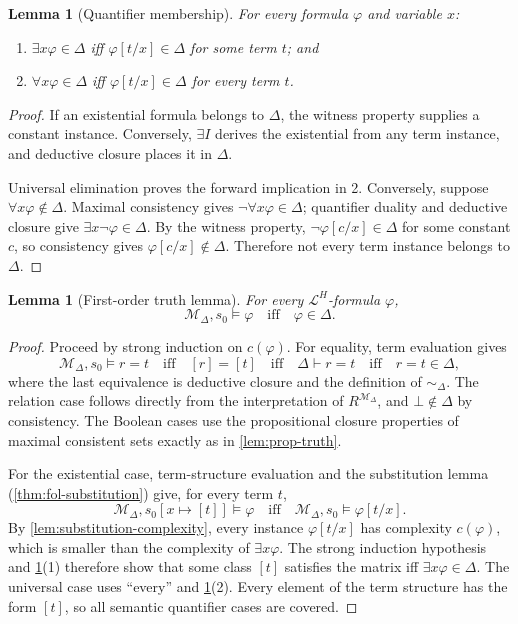 \documentclass[11pt,oneside,openany]{book}
\theoremstyle{definition}
\theoremstyle{plain}
\newtheorem{lemma}[definition]{Lemma}
\theoremstyle{remark}
\newcommand{\Lang}{\mathcal{L}}
\newcommand{\Meta}{\mathcal{M}}
\newcommand{\entails}{\models}
\newcommand{\derives}{\vdash}
\newcommand{\bottom}{\bot}
\begin{document}
\begin{lemma}[Quantifier membership]
\label{lem:quantifier-membership}
For every formula \(\varphi\) and variable \(x\):
\begin{enumerate}
  \item \(\exists x\varphi\in\Delta\) iff
        \(\varphi[t/x]\in\Delta\) for some term \(t\); and
  \item \(\forall x\varphi\in\Delta\) iff
        \(\varphi[t/x]\in\Delta\) for every term \(t\).
\end{enumerate}
\end{lemma}
\begin{proof}
If an existential formula belongs to \(\Delta\), the witness property supplies
a constant instance.  Conversely, \(\exists I\) derives the existential from
any term instance, and deductive closure places it in \(\Delta\).

Universal elimination proves the forward implication in 2.  Conversely,
suppose \(\forall x\varphi\notin\Delta\).  Maximal consistency gives
\(\neg\forall x\varphi\in\Delta\); quantifier duality and deductive closure
give \(\exists x\neg\varphi\in\Delta\).  By the witness property,
\(\neg\varphi[c/x]\in\Delta\) for some constant \(c\), so consistency gives
\(\varphi[c/x]\notin\Delta\).  Therefore not every term instance belongs to
\(\Delta\).
\end{proof}

\begin{lemma}[First-order truth lemma]
\label{lem:fol-truth}
For every \(\Lang^H\)-formula \(\varphi\),
\[
 \Meta_\Delta,s_0\entails\varphi
 \quad\text{iff}\quad
 \varphi\in\Delta.
\]
\end{lemma}
\begin{proof}
Proceed by strong induction on \(c(\varphi)\).  For equality, term evaluation gives
\[
 \Meta_\Delta,s_0\entails r=t
 \quad\text{iff}\quad [r]=[t]
 \quad\text{iff}\quad \Delta\derives r=t
 \quad\text{iff}\quad r=t\in\Delta,
\]
where the last equivalence is deductive closure and the definition of
\(\sim_\Delta\).  The relation case follows directly from the interpretation
of \(R^{\Meta_\Delta}\), and \(\bottom\notin\Delta\) by consistency.  The
Boolean cases use the propositional closure properties of maximal consistent
sets exactly as in \cref{lem:prop-truth}.

For the existential case, term-structure evaluation and the substitution
lemma (\cref{thm:fol-substitution}) give, for every term \(t\),
\[
 \Meta_\Delta,s_0[x\mapsto[t]]\entails\varphi
 \quad\text{iff}\quad
 \Meta_\Delta,s_0\entails\varphi[t/x].
\]
By \cref{lem:substitution-complexity}, every instance
\(\varphi[t/x]\) has complexity \(c(\varphi)\), which is smaller than the
complexity of \(\exists x\varphi\).  The strong induction hypothesis and
\cref{lem:quantifier-membership}(1) therefore show that
some class \([t]\) satisfies the matrix iff \(\exists x\varphi\in\Delta\).
The universal case uses ``every'' and
\cref{lem:quantifier-membership}(2).  Every element of the term structure has the
form \([t]\), so all semantic quantifier cases are covered.
\end{proof}
\end{document}
